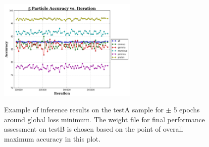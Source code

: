 \documentclass[11pt,a4paper]{article}
\begin{document}
\begin{figure}[t]
  \centering  
\includegraphics[width=0.6\textwidth]{Figures/testAinference.png}\\
\caption{Example of inference results on the testA sample for $\pm$ 5 epochs around global loss minimum. The weight file for final performance assessment on testB is chosen based on the point of overall maximum accuracy in this plot. }
  \label{fig:inferenceA}
\end{figure}
\end{document}

